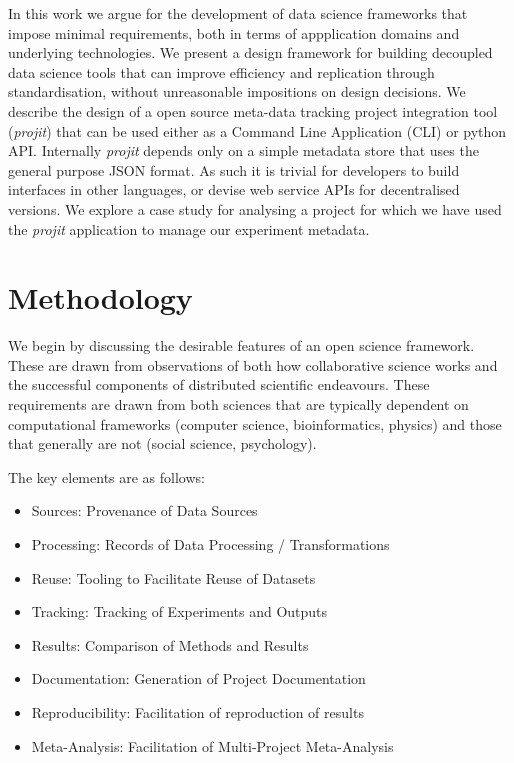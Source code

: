 \documentclass[sigconf]{acmart}
\begin{document}
In this work we argue for the development of data science frameworks that impose minimal 
requirements, both in terms of appplication domains and underlying technologies. 
We present a design framework for building decoupled data science tools that can 
improve efficiency and replication through standardisation, without
unreasonable impositions on design decisions. We describe the design of a open 
source meta-data tracking project integration tool (\textit{projit}) that can be used either as a 
Command Line Application (CLI) or python API. Internally \textit{projit} depends 
only on a simple metadata store that uses the general purpose JSON format. 
As such it is trivial for developers to build interfaces in other
languages, or devise web service APIs for decentralised versions. We explore a 
case study for analysing a project for which we have used 
the \textit{projit} application to manage our experiment metadata.


\section{Methodology}

We begin by discussing the desirable features of an open science framework. 
These are drawn from observations of both how collaborative science works and the 
successful components of distributed scientific endeavours. These requirements are 
drawn from both sciences that are typically dependent on computational frameworks 
(computer science, bioinformatics, physics) and those that generally are not
(social science, psychology).

The key elements are as follows:

\begin{itemize}
 \item Sources: Provenance of Data Sources
 \item Processing: Records of Data Processing / Transformations
 \item Reuse: Tooling to Facilitate Reuse of Datasets
 \item Tracking: Tracking of Experiments and Outputs
 \item Results: Comparison of Methods and Results
 \item Documentation: Generation of Project Documentation
 \item Reproducibility: Facilitation of reproduction of results
 \item Meta-Analysis: Facilitation of Multi-Project Meta-Analysis
\end{itemize}
\end{document}
